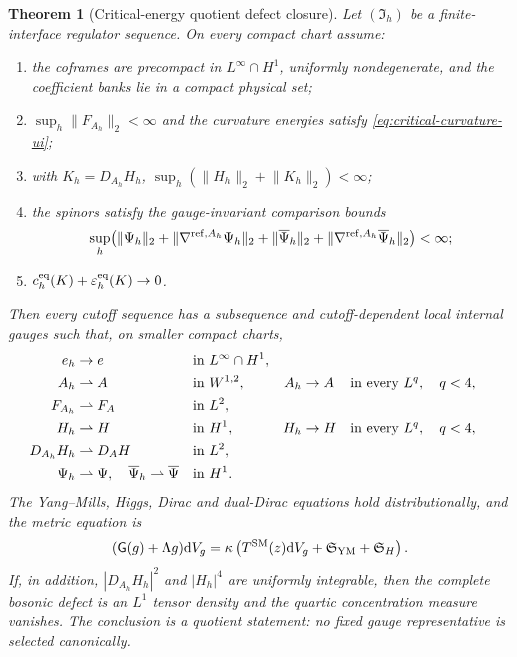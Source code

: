 \documentclass[11pt]{article}
\numberwithin{equation}{section}
\newtheorem{theorem}{Theorem}[section]
\theoremstyle{definition}
\theoremstyle{remark}
\newcommand{\dd}{\mathrm d}
\newcommand{\norm}[1]{\lVert#1\rVert}
\newcommand{\Eins}{\mathsf G}
\newcommand{\bPsi}{\overline\Psi}
\newcommand{\dV}{\dd V}
\newcommand{\Iface}{\mathfrak I}
\begin{document}
\begin{theorem}[Critical-energy quotient defect closure]
\label{thm:critical-quotient-defect}
Let $(\Iface_h)$ be a finite-interface regulator sequence.  On every compact
chart assume:
\begin{enumerate}[label=\textup{(Q\arabic*)},leftmargin=3.2em]
\item the coframes are precompact in $L^\infty\cap H^1$, uniformly
      nondegenerate, and the coefficient banks lie in a compact physical set;
\item $\sup_h\norm{F_{A_h}}_2<\infty$ and the curvature energies satisfy
      \eqref{eq:critical-curvature-ui};
\item with $K_h=D_{A_h}H_h$,
      $\sup_h(\norm{H_h}_2+\norm{K_h}_2)<\infty$;
\item the spinors satisfy the gauge-invariant comparison bounds
      \begin{equation}
       \sup_h\bigl(
       \norm{\Psi_h}_2+\norm{\nabla^{{\rm ref},A_h}\Psi_h}_2
       +\norm{\bPsi_h}_2+\norm{\nabla^{{\rm ref},A_h}\bPsi_h}_2
       \bigr)<\infty;
       \label{eq:critical-spinor-bound}
      \end{equation}
\item $c_h^{\rm eq}(K)+\varepsilon_h^{\rm eq}(K)\to0$.
\end{enumerate}
Then every cutoff sequence has a subsequence and cutoff-dependent local
internal gauges such that, on smaller compact charts,
\begin{align}
 e_h&\to e &&\text{in }L^\infty\cap H^1,\notag\\
 A_h&\rightharpoonup A &&\text{in }W^{1,2},
 &A_h&\to A &&\text{in every }L^q,
   \quad q<4,\notag\\
 F_{A_h}&\rightharpoonup F_A &&\text{in }L^2,\notag\\
 H_h&\rightharpoonup H &&\text{in }H^1,
 &H_h&\to H &&\text{in every }L^q,
   \quad q<4,\notag\\
 D_{A_h}H_h&\rightharpoonup D_AH &&\text{in }L^2,\notag\\
 \Psi_h&\rightharpoonup\Psi,
 \quad\bPsi_h\rightharpoonup\bPsi
 &&\text{in }H^1.
 \label{eq:critical-quotient-convergence}
\end{align}
The Yang--Mills, Higgs, Dirac and dual-Dirac equations hold distributionally,
and the metric equation is
\begin{equation}
 (\Eins(g)+\Lambda g)\dV_g
 =\kappa\left(T^{\rm SM}(z)\dV_g+\mathfrak S_{\rm YM}+\mathfrak S_H\right).
 \label{eq:critical-quotient-einstein}
\end{equation}
If, in addition, $|D_{A_h}H_h|^2$ and $|H_h|^4$ are uniformly integrable,
then the complete bosonic defect is an $L^1$ tensor density and the quartic
concentration measure vanishes.  The conclusion is a quotient statement: no
fixed gauge representative is selected canonically.
\end{theorem}
\end{document}
